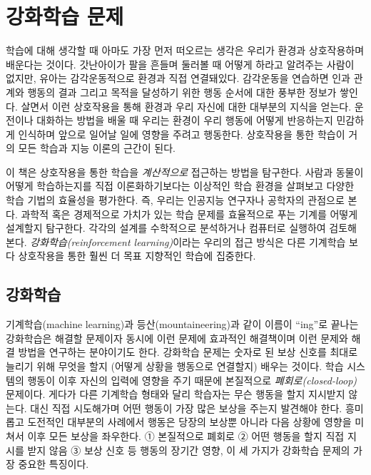 
\chapter{강화학습 문제}

학습에 대해 생각할 때 아마도 가장 먼저 떠오르는 생각은 우리가 환경과
상호작용하며 배운다는 것이다. 갓난아이가 팔을 흔들며 둘러볼 때 어떻게 하라고
알려주는 사람이 없지만, 유아는 감각운동적으로 환경과 직접 연결돼있다. 감각운동을
연습하면 인과 관계와 행동의 결과 그리고 목적을 달성하기 위한 행동 순서에 대한
풍부한 정보가 쌓인다. 살면서 이런 상호작용을 통해 환경과 우리 자신에 대한
대부분의 지식을 얻는다. 운전이나 대화하는 방법을 배울 때 우리는 환경이 우리
행동에 어떻게 반응하는지 민감하게 인식하며 앞으로 일어날 일에 영향을 주려고
행동한다. 상호작용을 통한 학습이 거의 모든 학습과 지능 이론의 근간이 된다.

이 책은 상호작용을 통한 학습을 \emph{계산적으로} 접근하는 방법을 탐구한다.
사람과 동물이 어떻게 학습하는지를 직접 이론화하기보다는 이상적인 학습 환경을
살펴보고 다양한 학습 기법의 효율성을 평가한다. 즉, 우리는 인공지능 연구자나
공학자의 관점으로 본다. 과학적 혹은 경제적으로 가치가 있는 학습 문제를
효율적으로 푸는 기계를 어떻게 설계할지 탐구한다. 각각의 설계를 수학적으로
분석하거나 컴퓨터로 실행하여 검토해본다.
\emph{강화학습(reinforcement learning)}이라는 우리의 접근 방식은 다른 기계학습
보다 상호작용을 통한 훨씬 더 목표 지향적인 학습에 집중한다.

\section{강화학습}

기계학습(machine learning)과 등산(mountaineering)과 같이 이름이 ``ing''로 끝나는
강화학습은 해결할 문제이자 동시에 이런 문제에 효과적인 해결책이며 이런 문제와
해결 방법을 연구하는 분야이기도 한다. 강화학습 문제는 숫자로 된 보상 신호를
최대로 늘리기 위해 무엇을 할지 (어떻게 상황을 행동으로 연결할지) 배우는 것이다.
학습 시스템의 행동이 이후 자신의 입력에 영향을 주기 때문에 본질적으로
\emph{폐회로(closed-loop)} 문제이다. 게다가 다른 기계학습 형태와 달리 학습자는
무슨 행동을 할지 지시받지 않는다. 대신 직접 시도해가며 어떤 행동이 가장 많은
보상을 주는지 발견해야 한다. 흥미롭고 도전적인 대부분의 사례에서 행동은 당장의
보상뿐 아니라 다음 상황에 영향을 미쳐서 이후 모든 보상을 좌우한다. ① 본질적으로
폐회로 ② 어떤 행동을 할지 직접 지시를 받지 않음 ③ 보상 신호 등 행동의 장기간
영향, 이 세 가지가 강화학습 문제의 가장 중요한 특징이다.


